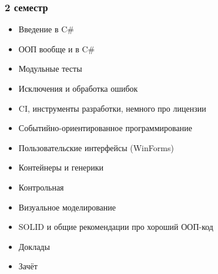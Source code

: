 \documentclass[xetex,mathserif,serif]{beamer}
\begin{document}
    \begin{frame}
        \frametitle{2 семестр}
        \begin{scriptsize}
            \begin{itemize}
                \item Введение в C\#
                \item ООП вообще и в C\#
                \item Модульные тесты
                \item Исключения и обработка ошибок
                \item CI, инструменты разработки, немного про лицензии
                \item Событийно-ориентированное программирование
                \item Пользовательские интерфейсы (WinForms)
                \item Контейнеры и генерики
                \item Контрольная
                \item Визуальное моделирование
                \item SOLID и общие рекомендации про хороший ООП-код
                \item Доклады
                \item Зачёт
            \end{itemize}
        \end{scriptsize}
    \end{frame}
\end{document}
